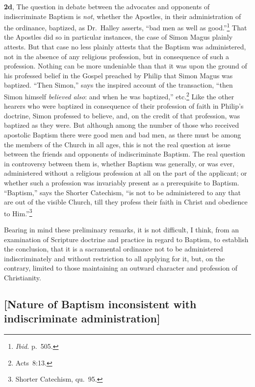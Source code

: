 \documentclass[
  english,
]{book}
\begin{document}
\textbf{2d}, The question in debate between the advocates and opponents of indiscriminate Baptism is \emph{not}, whether the Apostles, in their administration of the ordinance, baptized, as Dr.~Halley asserts, ``bad men as well as good.''\footnote{\emph{Ibid.} p.~505.} That the Apostles did so in particular instances, the case of Simon Magus plainly attests. But that case no less plainly attests that the Baptism was administered, not in the absence of any religious profession, but in consequence of such a profession. Nothing can be more undeniable than that it was upon the ground of his professed belief in the Gospel preached by Philip that Simon Magus was baptized. ``Then Simon,'' says the inspired account of the transaction, ``then Simon himself \emph{believed also}: and when he was baptized,'' etc.\footnote{Acts~8:13.} Like the other hearers who were baptized in consequence of their profession of faith in Philip's doctrine, Simon professed to believe, and, on the credit of that profession, was baptized as they were. But although among the number of those who received apostolic Baptism there were good men and bad men, as there must be among the members of the Church in all ages, this is not the real question at issue between the friends and opponents of indiscriminate Baptism. The real question in controversy between them is, whether Baptism was generally, or was ever, administered without a religious profession at all on the part of the applicant; or whether such a profession was invariably present as a prerequisite to Baptism. ``Baptism,'' says the Shorter Catechism, ``is not to be administered to any that are out of the visible Church, till they profess their faith in Christ and obedience to Him.''\footnote{Shorter Catechism, qu.~95.}

Bearing in mind these preliminary remarks, it is not difficult, I think, from an examination of Scripture doctrine and practice in regard to Baptism, to establish the conclusion, that it is a sacramental ordinance not to be administered indiscriminately and without restriction to all applying for it, but, on the contrary, limited to those maintaining an outward character and profession of Christianity.

\hypertarget{nature-of-baptism-inconsistent-with-indiscriminate-administration}{%
\subsection{{[}Nature of Baptism inconsistent with indiscriminate administration{]}}\label{nature-of-baptism-inconsistent-with-indiscriminate-administration}}
\end{document}
